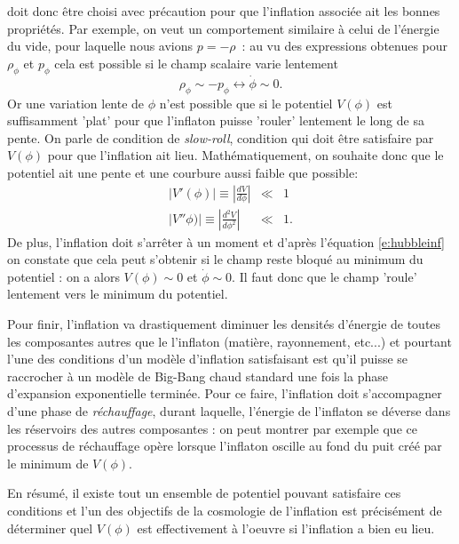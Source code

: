  doit donc être choisi avec précaution pour que l'inflation associée ait les bonnes propriétés. Par exemple, on veut un comportement similaire à celui de l'énergie du vide, pour laquelle nous avions $p=-\rho$~: au vu des expressions obtenues pour $\rho_\phi$ et $p_\phi$ cela est possible si le champ scalaire varie lentement
\begin{equation}
\rho_\phi\sim -p_\phi \leftrightarrow \dot \phi \sim 0.
\end{equation}
Or une variation lente de $\phi$ n'est possible que si le potentiel $V(\phi)$ est suffisamment 'plat' pour que l'inflaton puisse 'rouler' lentement le long de sa pente. On parle de condition de \textit{slow-roll}, condition qui doit être satisfaire par $V(\phi)$ pour que l'inflation ait lieu. Mathématiquement, on souhaite donc que le potentiel ait une pente et une courbure aussi faible que possible:
\begin{eqnarray}
|V'(\phi)|\equiv|\frac{d V}{d\phi}| &\ll& 1\\
|V''\phi)|\equiv|\frac{d ^2 V}{d\phi^2}| &\ll& 1.
\end{eqnarray}
De plus, l'inflation doit s'arrêter à un moment et d'après l'équation \ref{e:hubbleinf} on constate que cela peut s'obtenir si le champ reste bloqué au minimum du potentiel : on a alors $V(\phi)\sim 0$ et $\dot \phi \sim 0$. Il faut donc que le champ 'roule' lentement vers le minimum du potentiel. 

Pour finir, l'inflation va drastiquement diminuer les densités d'énergie de toutes les composantes autres que le l'inflaton (matière, rayonnement, etc...) et pourtant l'une des conditions d'un modèle d'inflation satisfaisant est qu'il puisse se raccrocher à un modèle de Big-Bang chaud standard une fois la phase d'expansion exponentielle terminée. Pour ce faire, l'inflation doit s'accompagner d'une phase de \textit{réchauffage}, durant laquelle, l'énergie de l'inflaton se déverse dans les réservoirs des autres composantes : on peut montrer par exemple que ce processus de réchauffage opère lorsque l'inflaton oscille au fond du puit créé par le minimum de $V(\phi)$.


En résumé, il existe tout un ensemble de potentiel pouvant satisfaire ces conditions et l'un des objectifs de la cosmologie de l'inflation est précisément de déterminer quel $V(\phi)$ est effectivement à l'oeuvre si l'inflation a bien eu lieu.



